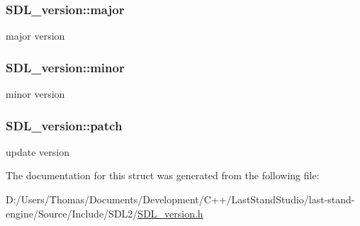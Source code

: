 \subsubsection[{major}]{ S\+D\+L\+\_\+version\+::major}\label{structSDL__version_ad7d7674532073eed237b90f546c97cd0}
major version \hypertarget{structSDL__version_a6c35c7bf80245028d5970e6a504ecf57}{}
\subsubsection[{minor}]{ S\+D\+L\+\_\+version\+::minor}\label{structSDL__version_a6c35c7bf80245028d5970e6a504ecf57}
minor version \hypertarget{structSDL__version_aa6dacff18edee8cd037c773b843be0f1}{}
\subsubsection[{patch}]{ S\+D\+L\+\_\+version\+::patch}\label{structSDL__version_aa6dacff18edee8cd037c773b843be0f1}
update version 

The documentation for this struct was generated from the following file\+:\begin{DoxyCompactItemize}
\item 
D\+:/\+Users/\+Thomas/\+Documents/\+Development/\+C++/\+Last\+Stand\+Studio/last-\/stand-\/engine/\+Source/\+Include/\+S\+D\+L2/\hyperlink{SDL__version_8h}{S\+D\+L\+\_\+version.\+h}\end{DoxyCompactItemize}
